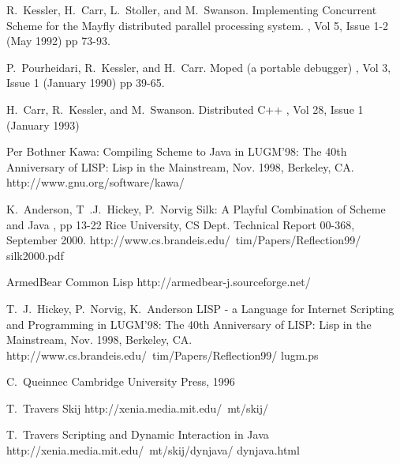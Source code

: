 \documentclass{acm-final/sig-alternate-modified}
\begin{document}
\begin{thebibliography}{1}

 R.~Kessler, H.~Carr, L.~Stoller, and M.~Swanson.
\newblock Implementing Concurrent Scheme for the Mayfly distributed
parallel processing system.  , Vol 5, Issue 1-2 (May 1992) pp 73-93.

P.~Pourheidari, R.~Kessler, and H.~Carr.
\newblock Moped (a portable debugger)
, Vol 3, Issue 1 (January 1990) pp 39-65.

H.~Carr, R.~Kessler, and M.~Swanson.
\newblock Distributed C++
, Vol 28, Issue 1 (January 1993)

Per Bothner
\newblock Kawa: Compiling Scheme to Java
\newblock in LUGM'98: The 40th Anniversary of LISP: Lisp in the Mainstream, Nov. 1998, Berkeley, CA.
\newblock http://www.gnu.org/software/kawa/

K.~Anderson, T~.J.~Hickey, P.~Norvig
\newblock Silk: A Playful Combination of Scheme and Java
 , pp 13-22
\newblock Rice University, CS Dept. Technical Report 00-368, September 2000.
\newblock http://www.cs.brandeis.edu/~tim/Papers/Reflection99/ silk2000.pdf

\newblock ArmedBear Common Lisp
\newblock http://armedbear-j.sourceforge.net/


T.~J.~Hickey, P.~Norvig, K.~Anderson
\newblock LISP - a Language for Internet Scripting and Programming
\newblock in LUGM'98: The 40th Anniversary of LISP: Lisp in the Mainstream, Nov. 1998, Berkeley, CA.
\newblock http://www.cs.brandeis.edu/~tim/Papers/Reflection99/ lugm.ps

C.~Queinnec
\newblock Cambridge University Press, 1996

T.~Travers
\newblock Skij
\newblock http://xenia.media.mit.edu/~mt/skij/

T.~Travers
\newblock Scripting and Dynamic Interaction in Java
\newblock http://xenia.media.mit.edu/~mt/skij/dynjava/ dynjava.html


\end{thebibliography}
\end{document}

